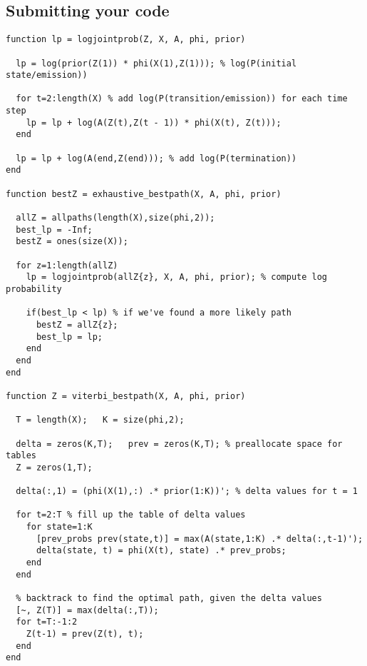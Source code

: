 \documentclass[11pt]{article}
\begin{document}
\newpage
\subsection{Submitting your code}
{\small
\begin{verbatim}
function lp = logjointprob(Z, X, A, phi, prior)

  lp = log(prior(Z(1)) * phi(X(1),Z(1))); % log(P(initial state/emission))

  for t=2:length(X) % add log(P(transition/emission)) for each time step
    lp = lp + log(A(Z(t),Z(t - 1)) * phi(X(t), Z(t)));
  end
  
  lp = lp + log(A(end,Z(end))); % add log(P(termination))
end

function bestZ = exhaustive_bestpath(X, A, phi, prior)

  allZ = allpaths(length(X),size(phi,2));
  best_lp = -Inf;
  bestZ = ones(size(X));

  for z=1:length(allZ)
    lp = logjointprob(allZ{z}, X, A, phi, prior); % compute log probability

    if(best_lp < lp) % if we've found a more likely path
      bestZ = allZ{z};
      best_lp = lp;
    end
  end
end

function Z = viterbi_bestpath(X, A, phi, prior)

  T = length(X);   K = size(phi,2);

  delta = zeros(K,T);   prev = zeros(K,T); % preallocate space for tables
  Z = zeros(1,T);

  delta(:,1) = (phi(X(1),:) .* prior(1:K))'; % delta values for t = 1

  for t=2:T % fill up the table of delta values
    for state=1:K
      [prev_probs prev(state,t)] = max(A(state,1:K) .* delta(:,t-1)');
      delta(state, t) = phi(X(t), state) .* prev_probs;
    end
  end

  % backtrack to find the optimal path, given the delta values
  [~, Z(T)] = max(delta(:,T));
  for t=T:-1:2
    Z(t-1) = prev(Z(t), t);
  end
end
\end{verbatim}
}

\newpage
\end{document}
